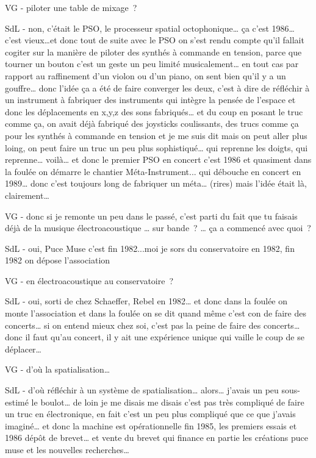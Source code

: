 VG - piloter une table de mixage ? 

SdL - non, c'était le PSO, le processeur spatial octophonique… ça c'est 1986… c'est vieux…et donc tout de suite avec le PSO on s'est rendu compte qu'il fallait cogiter sur la manière de piloter des synthés à commande en tension, parce que tourner un bouton c'est un geste un peu limité musicalement… en tout cas par rapport au raffinement d'un violon ou d'un piano, on sent bien qu'il y a un gouffre… donc l'idée ça a été de faire converger les deux, c'est à dire de réfléchir à un instrument à fabriquer des instruments qui intègre la pensée de l'espace et donc les déplacements en x,y,z des sons fabriqués… et du coup en posant le truc comme ça, on avait déjà fabriqué des joysticks coulissants, des trucs comme ça pour les synthés à commande en tension et je me suis dit mais on peut aller plus loing, on peut faire un truc un peu plus sophistiqué… qui reprenne les doigts, qui reprenne… voilà… et donc le premier PSO en concert c'est 1986 et quasiment dans la foulée on démarre le chantier Méta-Instrument... qui débouche en concert en 1989… donc c'est toujours long de fabriquer un méta… (rires) mais l'idée était là, clairement… 

VG - donc si je remonte un peu dans le passé, c'est parti du fait que tu faisais déjà de la musique électroacoustique … sur bande ? … ça a commencé avec quoi ? 

SdL - oui, Puce Muse c'est fin 1982...moi je sors du conservatoire en 1982, fin 1982 on dépose l'association 

VG - en électroacoustique au conservatoire ? 

SdL - oui, sorti de chez Schaeffer, Rebel en 1982… et donc dans la foulée on monte l'association et dans la foulée on se dit quand même c'est con de faire des concerts… si on entend mieux chez soi, c'est pas la peine de faire des concerts… donc il faut qu'au concert, il y ait une expérience unique qui vaille le coup de se déplacer… 

VG - d'où la spatialisation… 

SdL - d'où réfléchir à un système de spatialisation… alors… j'avais un peu sous-estimé le boulot… de loin je me disais  me disais c'est pas très compliqué de faire un truc en électronique, en fait c'est un peu plus compliqué que ce que j'avais imaginé… et donc la machine est opérationnelle fin 1985, les premiers essais et 1986 dépôt de brevet… et vente du brevet qui finance en partie les créations puce muse et les nouvelles recherches…  

